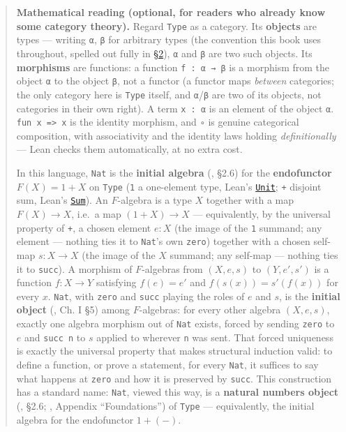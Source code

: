 \begin{quote}
\textbf{Mathematical reading (optional, for readers who already know some category theory).} Regard \texttt{Type} as a category. Its \textbf{objects} are types --- writing \texttt{α}, \texttt{β} for arbitrary types (the convention this book uses throughout, spelled out fully in \hyperref[sec:01-basics:02-def-let-implicit:1]{§2}), \texttt{α} and \texttt{β} are two such objects. Its \textbf{morphisms} are functions: a function \texttt{f : α → β} is a morphism from the object \texttt{α} to the object \texttt{β}, not a functor (a functor maps \emph{between} categories; the only category here is \texttt{Type} itself, and \texttt{α}/\texttt{β} are two of its objects, not categories in their own right). A term \texttt{x : α} is an element of the object \texttt{α}. \texttt{fun x => x} is the identity morphism, and \texttt{∘} is genuine categorical composition, with associativity and the identity laws holding \emph{definitionally} --- Lean checks them automatically, at no extra cost.

In this language, \texttt{Nat} is the \textbf{initial algebra} (\cite{Jacobs1999}, §2.6) for the \textbf{endofunctor} \(F(X) = 1 + X\) on \texttt{Type} (\texttt{1} a one-element type, Lean's \href{https://leanprover-community.github.io/mathlib4_docs/Init/Prelude.html\#Unit}{\texttt{Unit}}; \texttt{+} disjoint sum, Lean's \href{https://leanprover-community.github.io/mathlib4_docs/Init/Core.html\#Sum}{\texttt{Sum}}). An \(F\)-algebra is a type \(X\) together with a map \(F(X) \to X\), i.e.~a map \((1 + X) \to X\) --- equivalently, by the universal property of \texttt{+}, a chosen element \(e : X\) (the image of the \texttt{1} summand; any element --- nothing ties it to \texttt{Nat}'s own \texttt{zero}) together with a chosen self-map \(s : X \to X\) (the image of the \(X\) summand; any self-map --- nothing ties it to \texttt{succ}). A morphism of \(F\)-algebras from \((X, e, s)\) to \((Y, e', s')\) is a function \(f : X \to Y\) satisfying \(f(e) = e'\) and \(f(s(x)) = s'(f(x))\) for every \(x\). \texttt{Nat}, with \texttt{zero} and \texttt{succ} playing the roles of \(e\) and \(s\), is the \textbf{initial object} (\cite{MacLane1998}, Ch. I §5) among \(F\)-algebras: for every other algebra \((X, e, s)\), exactly one algebra morphism out of \texttt{Nat} exists, forced by sending \texttt{zero} to \(e\) and \texttt{succ n} to \(s\) applied to wherever \texttt{n} was sent. That forced uniqueness is exactly the universal property that makes structural induction valid: to define a function, or prove a statement, for every \texttt{Nat}, it suffices to say what happens at \texttt{zero} and how it is preserved by \texttt{succ}. This construction has a standard name: \texttt{Nat}, viewed this way, is a \textbf{natural numbers object} (\cite{Jacobs1999}, §2.6; \cite{MacLane1998}, Appendix ``Foundations'') of \texttt{Type} --- equivalently, the initial algebra for the endofunctor \(1 + (-)\).


\end{quote}
